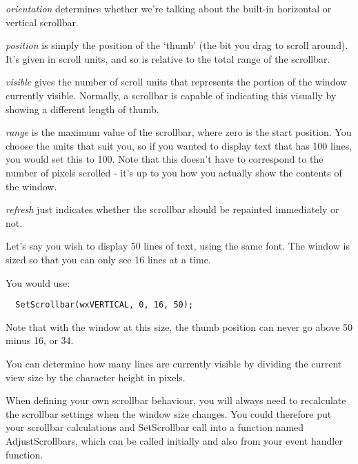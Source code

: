 {\it orientation} determines whether we're talking about
the built-in horizontal or vertical scrollbar.

{\it position} is simply the position of the `thumb' (the bit you drag to scroll around).
It's given in scroll units, and so is relative to the total range of the scrollbar.

{\it visible} gives the number of scroll units that represents the portion of the
window currently visible. Normally, a scrollbar is capable of indicating this visually
by showing a different length of thumb.

{\it range} is the maximum value of the scrollbar, where zero is the start
position. You choose the units that suit you,
so if you wanted to display text that has 100 lines, you would set this to 100.
Note that this doesn't have to correspond to the number of pixels scrolled - it's
up to you how you actually show the contents of the window.

{\it refresh} just indicates whether the scrollbar should be repainted immediately or not.


Let's say you wish to display 50 lines of text, using the same font.
The window is sized so that you can only see 16 lines at a time.

You would use:

{\small%
\begin{verbatim}
  SetScrollbar(wxVERTICAL, 0, 16, 50);
\end{verbatim}
}

Note that with the window at this size, the thumb position can never go
above 50 minus 16, or 34.

You can determine how many lines are currently visible by dividing the current view
size by the character height in pixels.

When defining your own scrollbar behaviour, you will always need to recalculate
the scrollbar settings when the window size changes. You could therefore put your
scrollbar calculations and SetScrollbar
call into a function named AdjustScrollbars, which can be called initially and also
from your  event handler function.



